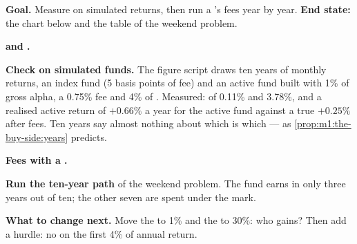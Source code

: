 \begin{tutorial}
\textbf{Goal.} Measure  on simulated returns, then run a
's fees year by year. \textbf{End state:} the chart below and the
table of the weekend problem.
\begin{tutsteps}
\item \textbf{ and .}
\label{lst:m1:the-buy-side:te}
\item \textbf{Check on simulated funds.} The figure script draws ten years
of monthly  returns, an index fund (5 basis points of fee) and an
active fund built with 1\% of gross alpha, a 0.75\% fee and 4\% of
. Measured:  of 0.11\% and 3.78\%, and a
realised active return of $+0.66\%$ a year for the active fund against a
true $+0.25\%$ after fees. Ten years say almost nothing about which is
which --- as \cref{prop:m1:the-buy-side:years} predicts.
\item \textbf{Fees with a .}
\label{lst:m1:the-buy-side:hwm}
\item \textbf{Run the ten-year path} of the weekend problem. The fund earns
 in only three years out of ten; the other seven are spent
under the mark.
\end{tutsteps}
\textbf{What to change next.} Move the  to 1\% and the
 to 30\%: who gains? Then add a hurdle: no  on
the first 4\% of annual return.
\end{tutorial}


